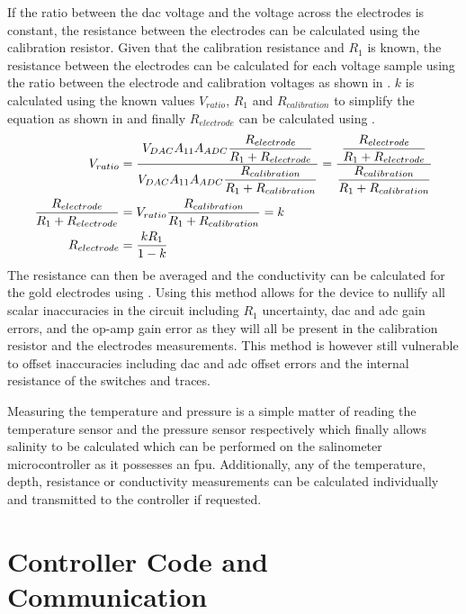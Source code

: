 If the ratio between the \gls{dac} voltage and the voltage across the electrodes is constant, the resistance between the electrodes can be calculated using the calibration resistor.
Given that the calibration resistance and $R_1$ is known, the resistance between the electrodes can be calculated for each voltage sample using the ratio between the electrode and calibration voltages as shown in .
$k$ is calculated using the known values $V_{ratio}$, $R_1$ and $R_{calibration}$ to simplify the equation as shown in  and finally $R_{electrode}$ can be calculated using .
\begin{align}
    V_{ratio} &= \frac{\displaystyle V_{DAC}A_{11}A_{ADC}\frac{\displaystyle R_{electrode}}{\displaystyle R_1 + R_{electrode}}}{\displaystyle V_{DAC}A_{11}A_{ADC}\frac{\displaystyle R_{calibration}}{\displaystyle R_1 + R_{calibration}}} = \frac{\displaystyle \frac{\displaystyle R_{electrode}}{\displaystyle R_1 + R_{electrode}}}{\displaystyle \frac{\displaystyle R_{calibration}}{\displaystyle R_1 + R_{calibration}}} \label{eqn:electrode-calib-resistance} \\
    \frac{\displaystyle R_{electrode}}{\displaystyle R_1 + R_{electrode}} &= V_{ratio} \frac{\displaystyle R_{calibration}}{\displaystyle R_1 + R_{calibration}} = k \label{eqn:electrode-calib-resistance-simplified} \\
    R_{electrode} &= \frac{\displaystyle kR_1}{\displaystyle 1 - k} \label{eqn:electrode-calib-resistance-final}
\end{align}
The resistance can then be averaged and the conductivity can be calculated for the gold electrodes using .
Using this method allows for the device to nullify all scalar inaccuracies in the circuit including $R_1$ uncertainty, \gls{dac} and \gls{adc} gain errors, and the op-amp gain error as they will all be present in the calibration resistor and the electrodes measurements.
This method is however still vulnerable to offset inaccuracies including \gls{dac} and \gls{adc} offset errors and the internal resistance of the switches and traces.

Measuring the temperature and pressure is a simple matter of reading the temperature sensor and the pressure sensor respectively which finally allows salinity to be calculated which can be performed on the salinometer microcontroller as it possesses an \gls{fpu}.
Additionally, any of the temperature, depth, resistance or conductivity measurements can be calculated individually and transmitted to the controller if requested.

\section{Controller Code and Communication}

